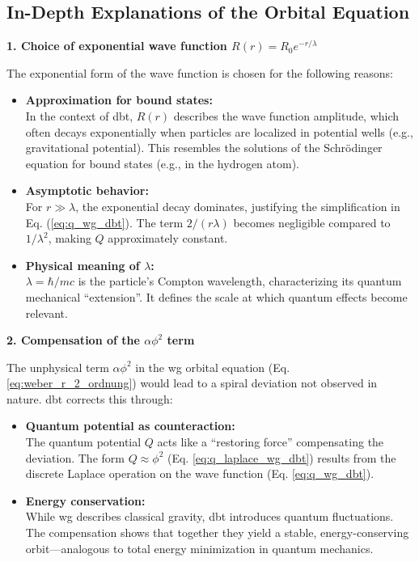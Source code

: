 \subsection{In-Depth Explanations of the Orbital Equation}
\textbf{1. Choice of exponential wave function $R(r)=R_0 e^{-r/\lambda}$}

The exponential form of the wave function is chosen for the following reasons:
\begin{itemize}
    \item \textbf{Approximation for bound states:}\\In the context of \gls{dbt}, $R(r)$ describes the wave function amplitude, which often decays exponentially when particles are localized in potential wells (e.g., gravitational potential). This resembles the solutions of the Schrödinger equation for bound states (e.g., in the hydrogen atom).
    \item \textbf{Asymptotic behavior:}\\For $r \gg \lambda$, the exponential decay dominates, justifying the simplification in Eq. (\ref{eq:q_wg_dbt}). The term $2/(r \lambda)$ becomes negligible compared to $1/\lambda^{2}$, making $Q$ approximately constant.
    \item \textbf{Physical meaning of $\lambda$:}\\$\lambda=\hbar/mc$ is the particle's Compton wavelength, characterizing its quantum mechanical \enquote{extension}. It defines the scale at which quantum effects become relevant.
\end{itemize}

\textbf{2. Compensation of the $\alpha \phi^{2}$ term}

The unphysical term $\alpha \phi^{2}$ in the \gls{wg} orbital equation (Eq. \ref{eq:weber_r_2_ordnung}) would lead to a spiral deviation not observed in nature.
\gls{dbt} corrects this through:
\begin{itemize}
    \item \textbf{Quantum potential as counteraction:}\\The quantum potential $Q$ acts like a \enquote{restoring force} compensating the deviation. The form $Q \approx \phi^{2}$ (Eq. \ref{eq:q_laplace_wg_dbt}) results from the discrete Laplace operation on the wave function (Eq. \ref{eq:q_wg_dbt}).
    \item \textbf{Energy conservation:}\\While \gls{wg} describes classical gravity, \gls{dbt} introduces quantum fluctuations. The compensation shows that together they yield a stable, energy-conserving orbit—analogous to total energy minimization in quantum mechanics.
\end{itemize}

